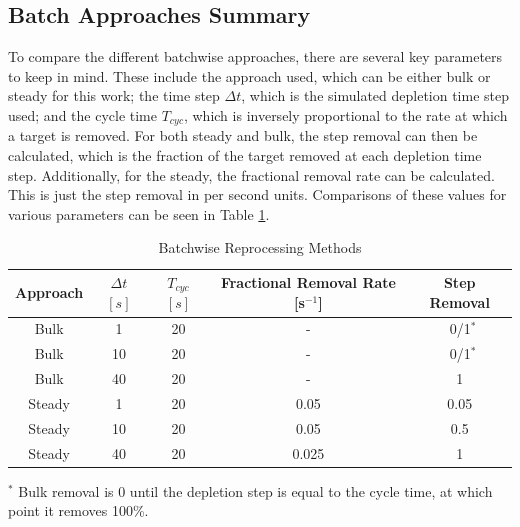 
\subsection{Batch Approaches Summary}
\label{s:batch-sum}

To compare the different batchwise approaches, there are several key parameters to keep in mind. These include the approach used, which can be either bulk or steady for this work; the time step $\Delta t$, which is the simulated depletion time step used; and the cycle time $T_{cyc}$, which is inversely proportional to the rate at which a target is removed. For both steady and bulk, the step removal can then be calculated, which is the fraction of the target removed at each depletion time step. Additionally, for the steady, the fractional removal rate can be calculated. This is just the step removal in per second units. Comparisons of these values for various parameters can be seen in Table \ref{tab:batch_methods}.

\begin{table}[H]
\renewcommand{\arraystretch}{1.25}
\caption{Batchwise Reprocessing Methods}
\label{tab:batch_methods}
\begin{center}
\begin{tabular}{ c | c | c | c | c }
 \hline
        Approach & $\Delta t$ $[s]$ & $T_{cyc}$ $[s]$ & Fractional Removal Rate [s$^{-1}$] & Step Removal\\
 \hline
 \hline
        Bulk & 1 & 20 & - & \, 0/1$^{*}$\\
        Bulk & 10 & 20 & - & \, 0/1$^{*}$ \\
        Bulk & 40 & 20 & - & 1 \\
        Steady & 1 & 20 & 0.05 & 0.05\\
        Steady & 10 & 20 & 0.05 & 0.5\\
        Steady & 40 & 20 & 0.025 & 1\\
 \hline
\end{tabular}
\end{center}
\end{table}
        \begin{center}
\footnotesize{$^{*}$ Bulk removal is 0 until the depletion step is equal to the cycle time, at which point it removes 100\%.}\\
        \end{center}

